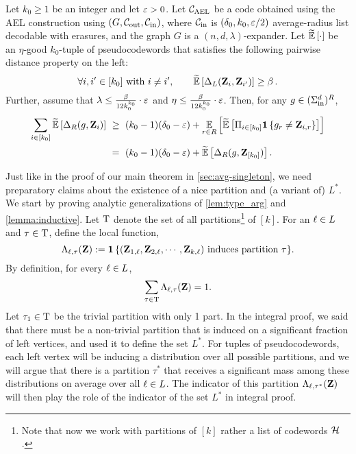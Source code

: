 \begin{theorem}\label{thm:sos_main}
	Let $k_0\geq 1$ be an integer and let $\varepsilon > 0$. Let ${ {\mathcal C}_{\mathrm{AEL}} }$ be a
code obtained using the AEL construction using $(G,{\mathcal C}_{\mathrm{out}}, {\mathcal C}_{\mathrm{in}})$, where ${\mathcal C}_{\mathrm{in}}$ is $(\delta_0, k_0, \varepsilon/2)$ average-radius list decodable with erasures, and the graph $G$ is a $(n,d,\lambda)$-expander. 
	Let $\tildeEx{\cdot}$ be an $\eta$-good $k_0$-tuple of pseudocodewords that satisfies the following pairwise distance property on the left:
	\[
		\forall i,i'\in [k_0] \text{ with } i\neq i', \qquad \tildeEx{\Delta_L(\zee_i, \zee_{i'})} \geq \beta\mper
	\]
	Further, assume that $\lambda \leq \frac{\beta}{12k_0^{k_0}}\cdot \varepsilon$ and $\eta \leq \frac{\beta}{12k_0^{k_0}}\cdot \varepsilon$.	Then, for any $g \in (\Sigma_{\mathrm{in}}^d)^R$,
	\begin{align*}
	\sum_{i\in [k_0]} \tildeEx{\Delta_R(g,\zee_i)} ~&\geq~ (k_0-1)(\delta_0-\eps) + \Ex{\ri \in R}{\tildeEx{ \Pi_{i\in [k_0]} \indi{g_{\ri} \neq \zee_{i,\ri}} }} \\
	~&=~ (k_0-1)(\delta_0 -\eps) + \tildeEx{\Delta_R(g,\zee_{[k_0]})}.
	\end{align*}
%
\end{theorem}
%
Just like in the proof of our main theorem in \cref{sec:avg-singleton}, we need preparatory claims about the existence of a nice partition and (a variant of) $L^*$. We start by proving analytic generalizations of \cref{lem:type_arg} and \cref{lemma:inductive}. Let ${\mathrm{T}}$ denote the set of all partitions\footnote{Note that now we work with partitions of $[k]$ rather a list of codewords ${\mathcal H}$.} of $[k]$. For an ${ \ell } \in L$ and $\tau \in {\mathrm{T}}$, define the local function, 
	\[
		\Lambda_{{ \ell }, \tau}({ \mathbf{Z} }) := {{\mathbf{1}} \left\{  ({ \mathbf{Z} }_{1, { \ell }}, { \mathbf{Z} }_{2, { \ell }}, \cdots , { \mathbf{Z} }_{k, { \ell }}) \text{ induces partition }\tau \right\} }.
	\]
	By definition, for every ${ \ell } \in L$,
	\[
		\sum_{\tau \in {\mathrm{T}}} \Lambda_{{ \ell }, \tau}({ \mathbf{Z} }) = 1.
	\]
	Let $\tau_1 \in {\mathrm{T}}$ be the trivial partition with only 1 part. In the integral proof, we said that there must be a non-trivial partition that is induced on a significant fraction of left vertices, and used it to define the set $L^*$. For tuples of pseudocodewords, each left vertex will be inducing a distribution over all possible partitions, and we will argue that there is a partition $\tau^*$ that receives a significant mass among these distributions on average over all ${ \ell } \in L$. The indicator of this partition $\Lambda_{{ \ell },\tau^*}({ \mathbf{Z} })$ will then play the role of the indicator of the set $L^*$ in integral proof.
